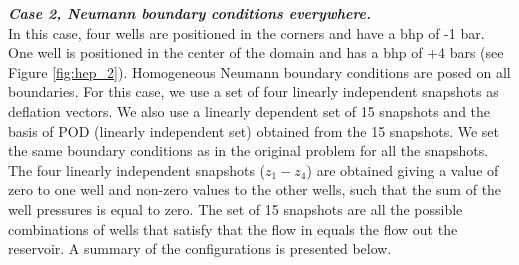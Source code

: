 \documentclass[12pt]{article}
\numberwithin{equation}{section}
\begin{document}
\textbf{\emph{Case 2, Neumann boundary conditions everywhere.}}\\
In this case, four wells are positioned in the corners and have a bhp of -1 bar. One well
is positioned in the center of the domain and has a bhp of +4 bars
(see Figure \ref{fig:hep_2}). Homogeneous Neumann boundary conditions are posed on all boundaries. For this case, we use a set of four linearly independent snapshots as deflation vectors. We also use a linearly dependent set of 15 snapshots and the basis of POD (linearly independent set) obtained from the 15 snapshots. We set the same boundary conditions as in the original problem for all the snapshots.
The four linearly independent snapshots ($z_1-z_4$) are obtained giving a value of zero to one well and non-zero values to the other wells, such that the sum of the well pressures is equal to zero. The set of 15 snapshots are all the possible combinations of wells that satisfy that the flow in equals the flow out the reservoir.
A summary of the configurations is presented below.
\renewcommand{\arraystretch}{1.3}
\end{document}
